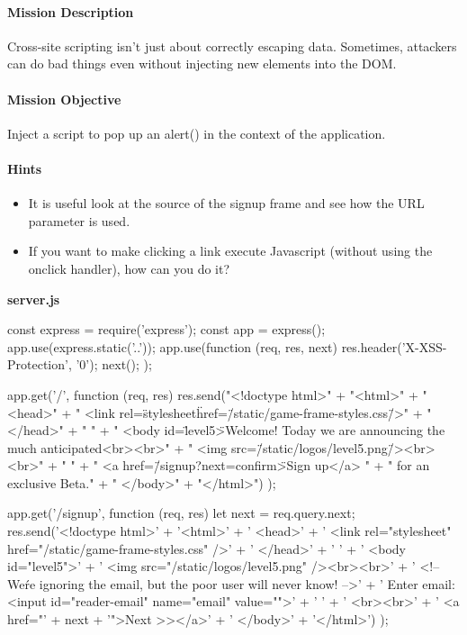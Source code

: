 \begin{Exercise}[label={websec-xss-game}]
\paragraph{Mission Description}
Cross-site scripting isn't just about correctly escaping data. Sometimes, attackers can do bad things even without injecting new elements into the DOM.
	
\paragraph{Mission Objective}
Inject a script to pop up an alert() in the context of the application.

\paragraph{Hints}
\begin{itemize}
\item It is useful look at the source of the signup frame and see how the URL parameter is used.
\item If you want to make clicking a link execute Javascript (without using the onclick handler), how can you do it?
\end{itemize}

\textbf{server.js}
\begin{js}
const express = require('express');
const app = express();
app.use(express.static('..'));
app.use(function (req, res, next) {
  res.header('X-XSS-Protection', '0');
  next();
});

app.get('/', function (req, res) {
    res.send("<!doctype html>\n" +
    "<html>\n" +
    "  <head>\n" +
    "    <link rel=\"stylesheet\" href=\"/static/game-frame-styles.css\" />\n" +
    "  </head>\n" +
    " \n" + "  <body id=\"level5\">\n    Welcome! Today we are announcing the much anticipated<br><br>\n" +
    "    <img src=\"/static/logos/level5.png\" /><br><br>\n" +
    " \n" +
    "    <a href=\"/signup?next=confirm\">Sign up</a> \n" +
    "    for an exclusive Beta.\n" +
    "  </body>\n" +
    "</html>")
});

app.get('/signup', function (req, res) {
let next = req.query.next;
  res.send('<!doctype html>\n' +
  '<html>\n' +
  '  <head>\n' +
  '    <link rel="stylesheet" href="/static/game-frame-styles.css" />\n' +
  '  </head>\n' +
  ' \n' +
  '  <body id="level5">\n' +
  '    <img src="/static/logos/level5.png" /><br><br>\n' +
  '    <!-- We\'re ignoring the email, but the poor user will never know! -->\n' +
  '    Enter email: <input id="reader-email" name="email" value="">\n' +
  ' \n' +
  '    <br><br>\n' +
  '    <a href="' + next + '">Next >></a>\n' +
  '  </body>\n' +
  '</html>')
});


\end{js}
\end{Exercise}
